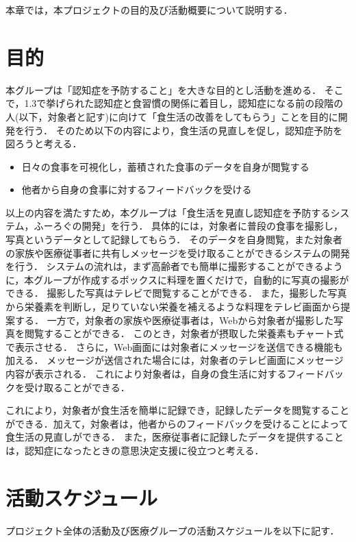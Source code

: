 \documentclass[../report]{subfiles}
\begin{document}
本章では，本プロジェクトの目的及び活動概要について説明する．

\section{目的} \label{sec:objective}
本グループは「認知症を予防すること」を大きな目的とし活動を進める．
そこで，1.3で挙げられた認知症と食習慣の関係に着目し，認知症になる前の段階の人(以下，対象者と記す)に向けて「食生活の改善をしてもらう」ことを目的に開発を行う．
そのため以下の内容により，食生活の見直しを促し，認知症予防を図ろうと考える．

\begin{itemize}
    \item 日々の食事を可視化し，蓄積された食事のデータを自身が閲覧する
    \item 他者から自身の食事に対するフィードバックを受ける
\end{itemize}

以上の内容を満たすため，本グループは「食生活を見直し認知症を予防するシステム，ふーろぐの開発」を行う．
具体的には，対象者に普段の食事を撮影し，写真というデータとして記録してもらう．
そのデータを自身閲覧，また対象者の家族や医療従事者に共有しメッセージを受け取ることができるシステムの開発を行う．
システムの流れは，まず高齢者でも簡単に撮影することができるように，本グループが作成するボックスに料理を置くだけで，自動的に写真の撮影ができる．
撮影した写真はテレビで閲覧することができる．
また，撮影した写真から栄養素を判断し，足りていない栄養を補えるような料理をテレビ画面から提案する．
一方で，対象者の家族や医療従事者は，Webから対象者が撮影した写真を閲覧することができる．
このとき，対象者が摂取した栄養素もチャート式で表示させる．
さらに，Web画面には対象者にメッセージを送信できる機能も加える．
メッセージが送信された場合には，対象者のテレビ画面にメッセージ内容が表示される．
これにより対象者は，自身の食生活に対するフィードバックを受け取ることができる．

これにより，対象者が食生活を簡単に記録でき，記録したデータを閲覧することができる．加えて，対象者は，他者からのフィードバックを受けることによって食生活の見直しができる．
また，医療従事者に記録したデータを提供することは，認知症になったときの意思決定支援に役立つと考える．


\section{活動スケジュール}
プロジェクト全体の活動及び医療グループの活動スケジュールを以下に記す．
\end{document}
